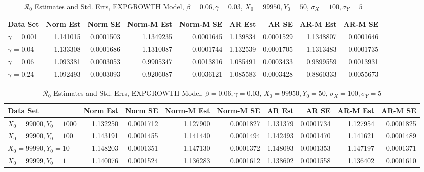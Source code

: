 \message{ !name(draft_v13.tex)}\documentclass[12pt]{article}
\newcommand{\rr}{\ensuremath{\mathcal{R}_0}}
\begin{document}
\begin{table}[H]
	
	\caption{\label{tab:}$\rr$ Estimates and Std. Errs, EXPGROWTH Model,
		$\beta = 0.06, \gamma = 0.03$, $X_0 = 99950, Y_0 = 50$, $\sigma_X = 100, \sigma_Y = 5$}
	\centering
	\begin{tabular}[t]{l|r|r|r|r|r|r|r|r}
		\hline
		Data Set & Norm Est & Norm SE & Norm-M Est & Norm-M SE & AR Est & AR SE & AR-M Est & AR-M SE\\
		\hline
		$\gamma$ = 0.001 & 1.141015 & 0.0001503 & 1.1349235 & 0.0001645 & 1.139834 & 0.0001529 & 1.1348807 & 0.0001646\\
		\hline
		$\gamma$ = 0.04 & 1.133308 & 0.0001686 & 1.1310087 & 0.0001744 & 1.132539 & 0.0001705 & 1.1313483 & 0.0001735\\
		\hline
		$\gamma$ = 0.06 & 1.093381 & 0.0003053 & 0.9905347 & 0.0013816 & 1.085491 & 0.0003433 & 0.9899559 & 0.0013931\\
		\hline
		$\gamma$ = 0.24 & 1.092493 & 0.0003093 & 0.9206087 & 0.0036121 & 1.085583 & 0.0003428 & 0.8860333 & 0.0055673\\
		\hline
	\end{tabular}
\end{table}

\begin{table}[H]
	
	\caption{\label{tab:}$\rr$ Estimates and Std. Errs, EXPGROWTH Model,
		$\beta = 0.06, \gamma = 0.03$, $X_0 = 99950, Y_0 = 50$, $\sigma_X = 100, \sigma_Y = 5$}
	\centering
	\begin{tabular}[t]{l|r|r|r|r|r|r|r|r}
		\hline
		Data Set & Norm Est & Norm SE & Norm-M Est & Norm-M SE & AR Est & AR SE & AR-M Est & AR-M SE\\
		\hline
		$X_0 = 99000, Y_0 = 1000$ & 1.132250 & 0.0001712 & 1.127900 & 0.0001827 & 1.131379 & 0.0001734 & 1.127954 & 0.0001825\\
		\hline
		$X_0 = 99900, Y_0 = 100$ & 1.143191 & 0.0001455 & 1.141440 & 0.0001494 & 1.142493 & 0.0001470 & 1.141621 & 0.0001489\\
		\hline
		$X_0 = 99990, Y_0 = 10$ & 1.148203 & 0.0001351 & 1.147130 & 0.0001372 & 1.148093 & 0.0001353 & 1.147197 & 0.0001371\\
		\hline
		$X_0 = 99999, Y_0 = 1$& 1.140076 & 0.0001524 & 1.136283 & 0.0001612 & 1.138602 & 0.0001558 & 1.136402 & 0.0001610\\
		\hline
	\end{tabular}
\end{table}
\end{document}
